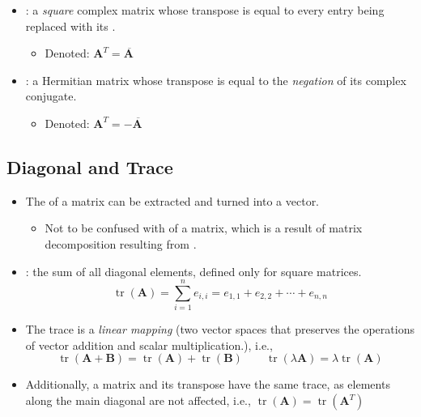 \begin{itemize}
\begin{itemize}
\begin{itemize}
      \item {}: a \emph{square} complex matrix whose transpose is equal to every entry being replaced with its \hyperref[Complex conjugate]{}. 
        \begin{itemize}
          \item Denoted: \(\bm{A}^T={\overline{\bm{A}\,}}\)
        \end{itemize}
      \item {}: a Hermitian matrix whose transpose is equal to the \emph{negation} of its complex conjugate.
      \begin{itemize}
        \item Denoted: \(\bm{A}^T=-{\overline{\bm{A}\,}}\)
      \end{itemize}
    \end{itemize}
  \end{itemize}

  \subsection{Diagonal and Trace}\label{Diagonal and Trace}
  \begin{itemize}
    \item The \hyperref[Diagonal]{} of a matrix can be extracted and turned into a vector.
      \begin{itemize}
        \item Not to be confused with \hyperref[Diagonalization]{} of a matrix, which is a result of matrix decomposition resulting from \hyperref[Eigendecomposition]{}.
      \end{itemize}
    \item {}: the sum of all diagonal elements, defined only for square matrices.
    \[%
    \operatorname{tr}(\bm{A}) = \sum_{i = 1}^{n} e_{i,i} = e_{1,1} + e_{2,2} + \cdots + e_{n,n}
    \]%
    \item The trace is a \emph{linear mapping} (two vector spaces that preserves the operations of vector addition and scalar multiplication.), i.e.,
    \[%
      \operatorname{tr}(\bm{A + B})  =  \operatorname{tr}(\bm{A}) + \operatorname{tr}(\bm{B})  \qquad
      \operatorname{tr}(\lambda\bm{A}) = \lambda\operatorname{tr}(\bm{A}) 
    \]%
    \item Additionally, a matrix and its transpose have the same trace, as elements along the main diagonal are not affected, i.e., \( \operatorname{tr}(\bm{A}) = \operatorname{tr}(\bm{A}^T)\) 
  \end{itemize}


\end{itemize}
